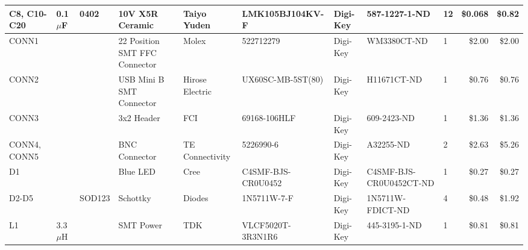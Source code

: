\documentclass{article}
\begin{document}
\begin{center}
\begin{tabular}{| l | l | l | l | l | l | l | l | l | r | r |}
      \hline
      C8, C10-C20             &  0.1$\mu$F       &  0402              &  10V X5R Ceramic                          &  Taiyo Yuden            &  LMK105BJ104KV-F                &  Digi-Key           &  587-1227-1-ND               &  12            &  \$0.068             &  \$0.82 \\
      \hline
      CONN1                   &                  &                    &  22 Position SMT FFC Connector            &  Molex                  &  522712279                      &  Digi-Key           &  WM3380CT-ND                 &  1             &  \$2.00              &  \$2.00 \\
      \hline
      CONN2                   &                  &                    &  USB Mini B SMT Connector                 &  Hirose Electric        &  UX60SC-MB-5ST(80)              &  Digi-Key           &  H11671CT-ND                 &  1             &  \$0.76              &  \$0.76 \\
      \hline
      CONN3                   &                  &                    &  3x2 Header                               &  FCI                    &  69168-106HLF                   &  Digi-Key           &  609-2423-ND                 &  1             &  \$1.36              &  \$1.36 \\
      \hline
      CONN4, CONN5            &                  &                    &  BNC Connector                            &  TE Connectivity        &  5226990-6                      &  Digi-Key           &  A32255-ND                   &  2             &  \$2.63              &  \$5.26 \\
      \hline
      D1                      &                  &                    &  Blue LED                                 &  Cree                   &  C4SMF-BJS-CR0U0452             &  Digi-Key           &  C4SMF-BJS-CR0U0452CT-ND     &  1             &  \$0.27              &  \$0.27 \\
      \hline
      D2-D5                   &                  &  SOD123            &  Schottky                                 &  Diodes                 &  1N5711W-7-F                    &  Digi-Key           &  1N5711W-FDICT-ND            &  4             &  \$0.48              &  \$1.92 \\
      \hline
      L1                      &  3.3$\mu$H       &                    &  SMT Power                                &  TDK                    &  VLCF5020T-3R3N1R6              &  Digi-Key           &  445-3195-1-ND               &  1             &  \$0.81              &  \$0.81 \\

\end{tabular}
\end{center}
\end{document}
